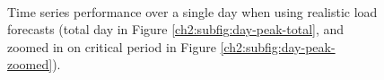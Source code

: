 \begin{figure}\centering
	\\
	\caption{Time series performance over a single day when using realistic load forecasts (total day in Figure \ref{ch2:subfig:day-peak-total}, and zoomed in on critical period in Figure \ref{ch2:subfig:day-peak-zoomed}).}
	\label{ch2:fig:day-peak}
\end{figure}